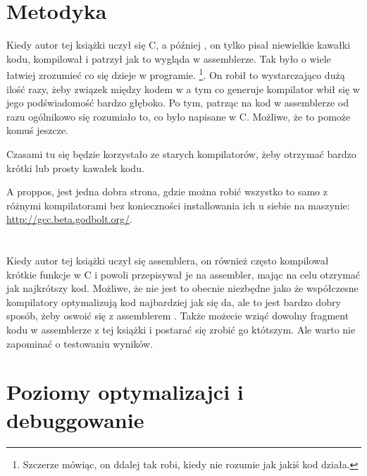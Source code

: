 \section{Metodyka}

Kiedy autor tej książki uczył się C, a później \Cpp, on tylko pisał niewielkie kawałki kodu, kompilował i patrzył jak to wygląda w assemblerze. Tak było o wiele łatwiej zrozumieć co się dzieje w programie.%
\footnote{Szczerze mówiąc, on ddalej tak robi, kiedy nie rozumie jak jakiś kod działa.}.
On robił to wystarczająco dużą ilość razy, żeby związek między kodem w \CCpp a tym co generuje kompilator wbił się w jego podświadomość bardzo głęboko. Po tym, patrząc na kod w assemblerze od razu ogólnikowo się rozumiało to, co było napisane w C. Możliwe, że to pomoże komuś jeszcze.


Czasami tu się będzie korzystało ze starych kompilatorów, żeby otrzymać bardzo krótki lub prosty kawałek kodu.

A proppos, jest jedna dobra strona, gdzie można robić wszystko to samo z różnymi kompilatorami bez konieczności installowania ich u siebie na maszynie: \url{http://gcc.beta.godbolt.org/}.

\section*{\Exercises}

Kiedy autor tej książki uczył się assemblera, on również często kompilował krótkie funkcje w C i powoli przepisywał je na assembler, mając na celu otzrymać jak najkrótszy kod. Możliwe, że nie jest to obecnie niezbędne jako że współczesne kompilatory optymalizują kod najbardziej jak się da, ale to jest bardzo dobry sposób, żeby oswoić się z assemblerem . Także możecie wziąć dowolny fragment kodu w assemblerze z tej książki i postarać się zrobić go któtszym. Ale warto nie zapominać o testowaniu wyników.

\section*{Poziomy optymalizajci i debuggowanie}

